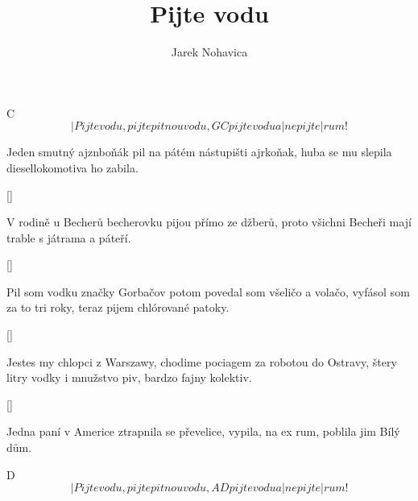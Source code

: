 \documentclass{song}
\title{Pijte vodu}
\author{Jarek Nohavica}
\begin{document}
   C
\[ |Pijte vodu, pijte pitnou vodu,
	         G        C
pijte vodu a |nepijte |rum! \]
\endstrophe

\strophe*
Jeden smutný ajznboňák
pil na pátém nástupišti ajrkoňak,
huba se mu slepila
diesellokomotiva ho zabila.
\endstrophe

\ref{}

\strophe*
V rodině u Becherů
becherovku pijou přímo ze džberů,
proto všichni Becheři
mají trable s játrama a páteří.
\endstrophe

\ref{}

\strophe*
Pil som vodku značky Gorbačov
potom povedal som všeličo a volačo,
vyfásol som za to tri roky,
teraz pijem chlórované patoky.
\endstrophe

\ref{}

\strophe*
Jestes my chlopci z Warszawy,
chodime pociagem za robotou do Ostravy,
štery litry vodky i mnužstvo piv,
bardzo fajny kolektiv.
\endstrophe

\ref{}

\strophe*
Jedna paní v Americe
ztrapnila se převelice,
vypila, na ex rum,
poblila jim Bílý dům.
\endstrophe

   D
\[ |Pijte vodu, pijte pitnou vodu,
	         A        D
pijte vodu a |nepijte |rum! \]
\endstrophe
\end{document}
